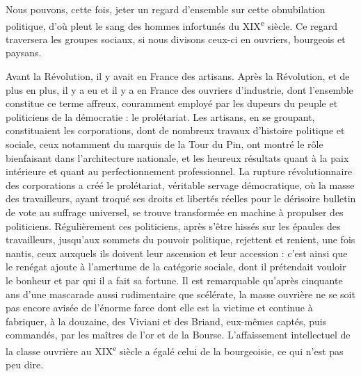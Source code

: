 \documentclass[french,twoside]{book} %
\begin{document}
Nous pouvons, cette fois, jeter un regard d’ensemble sur cette obnubilation politique, d’où pleut le sang des hommes infortunés du XIX\textsuperscript{e} siècle. Ce regard traversera les groupes sociaux, si nous divisons ceux-ci en ouvriers, bourgeois et paysans.\par
Avant la Révolution, il y avait en France des artisans. Après la Révolution, et de plus en plus, il y a eu et il y a en France des ouvriers d’industrie, dont l’ensemble constitue ce terme affreux, couramment employé par les dupeurs du peuple et politiciens de la démocratie : le prolétariat. Les artisans, en se groupant, constituaient les corporations, dont de nombreux travaux d’histoire politique et sociale, ceux notamment du marquis de la Tour du Pin, ont montré le rôle bienfaisant dans l’architecture nationale, et les heureux résultats quant à la paix intérieure et quant au perfectionnement professionnel. La rupture révolutionnaire des corporations a créé le prolétariat, véritable servage démocratique, où la masse des travailleurs, ayant troqué ses droits et libertés réelles pour le dérisoire bulletin de vote au suffrage universel, se trouve transformée en machine à propulser des politiciens. Régulièrement ces politiciens, après s’être hissés sur les épaules des travailleurs, jusqu’aux sommets du pouvoir politique, rejettent et renient, une fois nantis, ceux auxquels ils doivent leur ascension et leur accession : c’est ainsi que le renégat ajoute à l’amertume de la catégorie sociale, dont il prétendait vouloir le bonheur et par qui il a fait sa fortune. Il est remarquable qu’après cinquante ans d’une mascarade aussi rudimentaire que scélérate, la masse ouvrière ne se soit pas encore avisée de l’énorme farce dont elle est la victime et continue à fabriquer, à la douzaine, des Viviani et des Briand, eux-mêmes captés, puis commandés, par les maîtres de l’or et de la Bourse. L’affaissement intellectuel de la classe ouvrière au XIX\textsuperscript{e} siècle a égalé celui de la bourgeoisie, ce qui n’est pas peu dire.\par
\end{document}
